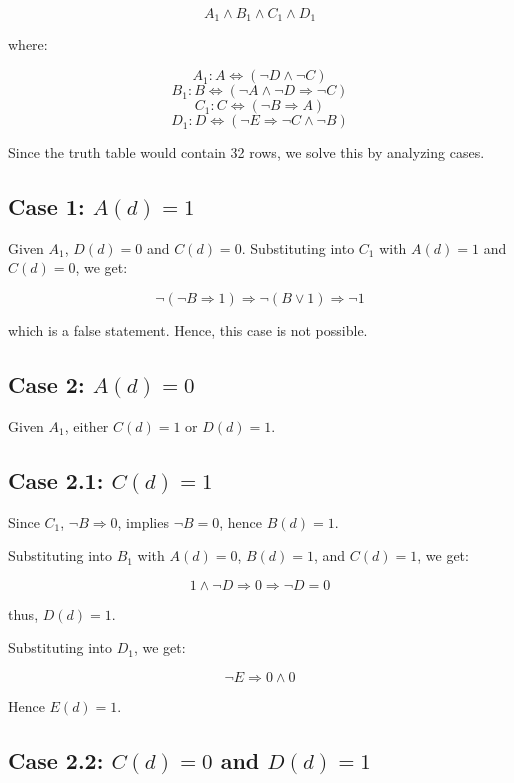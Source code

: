 \documentclass[11pt,paper=b5,footinclude,headinclude]{scrbook} %
\theoremstyle{remark}
\theoremstyle{definition} %
\theoremstyle{theorem} %
\begin{document}
\begin{enumerate}[Problem 1.]
\[
A_1 \land B_1 \land C_1 \land D_1
\]

where:

\[
A_1 : A \iff (\neg D \land \neg C)
\]
\[
B_1 : B \iff (\neg A \land \neg D \Rightarrow \neg C)
\]
\[
C_1 : C \iff (\neg B \Rightarrow A)
\]
\[
D_1 : D \iff (\neg E \Rightarrow \neg C \land \neg B)
\]

Since the truth table would contain 32 rows, we solve this by analyzing cases.

\subsection*{Case 1: \( A(d) = 1 \)}

Given \( A_1 \), \( D(d) = 0 \) and \( C(d) = 0 \). Substituting into \( C_1 \) with \( A(d) = 1 \) and \( C(d) = 0 \), we get:

\[
\neg (\neg B \Rightarrow 1) \Rightarrow \neg(B \lor 1) \Rightarrow \neg 1
\]

which is a false statement. Hence, this case is not possible.

\subsection*{Case 2: \( A(d) = 0 \)}

Given \( A_1 \), either \( C(d) = 1 \) or \( D(d) = 1 \).

\subsection*{Case 2.1: \( C(d) = 1 \)}

Since \( C_1 \), \( \neg B \Rightarrow 0 \), implies \( \neg B = 0 \), hence \( B(d) = 1 \).

Substituting into \( B_1 \) with \( A(d) = 0 \), \( B(d) = 1 \), and \( C(d) = 1 \), we get:

\[
1 \land \neg D \Rightarrow 0 \Rightarrow \neg D = 0
\]

thus, \( D(d) = 1 \).

Substituting into \( D_1 \), we get:

\[
\neg E \Rightarrow 0 \land 0
\]

Hence \( E(d) = 1 \).

\subsection*{Case 2.2: \( C(d) = 0 \) and \( D(d) = 1 \)}


\end{enumerate}
\end{document}
